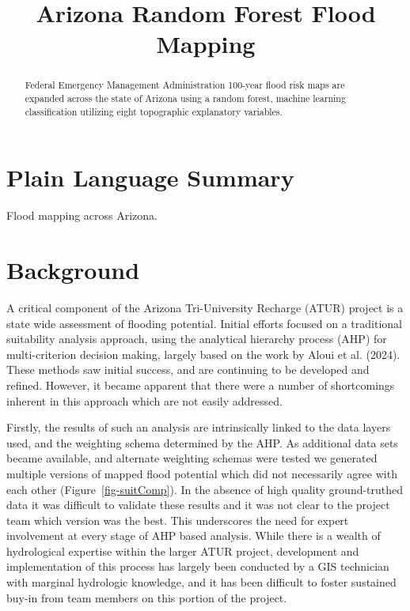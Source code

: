 \documentclass[
]{agujournal2019}
\begin{document}
\title{Arizona Random Forest Flood Mapping}



\begin{abstract}
Federal Emergency Management Administration 100-year flood risk maps are
expanded across the state of Arizona using a random forest, machine
learning classification utilizing eight topographic explanatory
variables.
\end{abstract}

\section*{Plain Language Summary}
Flood mapping across Arizona.




\section{Background}\label{background}

A critical component of the Arizona Tri-University Recharge (ATUR)
project is a state wide assessment of flooding potential. Initial
efforts focused on a traditional suitability analysis approach, using
the analytical hierarchy process (AHP) for multi-criterion decision
making, largely based on the work by Aloui et al. (2024). These methods
saw initial success, and are continuing to be developed and refined.
However, it became apparent that there were a number of shortcomings
inherent in this approach which are not easily addressed.

Firstly, the results of such an analysis are intrinsically linked to the
data layers used, and the weighting schema determined by the AHP. As
additional data sets became available, and alternate weighting schemas
were tested we generated multiple versions of mapped flood potential
which did not necessarily agree with each other
(Figure~\ref{fig-suitComp}). In the absence of high quality
ground-truthed data it was difficult to validate these results and it
was not clear to the project team which version was the best. This
underscores the need for expert involvement at every stage of AHP based
analysis. While there is a wealth of hydrological expertise within the
larger ATUR project, development and implementation of this process has
largely been conducted by a GIS technician with marginal hydrologic
knowledge, and it has been difficult to foster sustained buy-in from
team members on this portion of the project.
\end{document}
